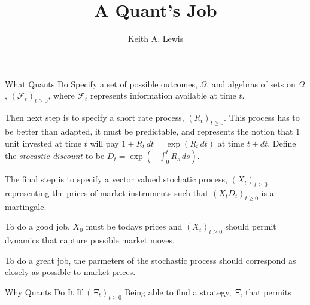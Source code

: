 \documentclass[fleqn]{amsart}
\title{A Quant's Job}
\author{Keith A. Lewis}
\def\F{\mathcal{F}}
\begin{document}
\maketitle

\begin{section}{What Quants Do}
Specify a set of possible outcomes, $\Omega$,
and algebras of sets on $\Omega$, $(\F_t)_{t\ge0}$, where $\F_t$ represents
information available at time $t$.

Then next step is to specify a short rate process, $(R_t)_{t\ge0}$.
This process has to be better than adapted, it must be predictable, and
represents the notion that 1 unit invested at time $t$ will pay $1 +
R_t\,dt = \exp(R_t\,dt)$ at time $t + dt$.  Define the {\em stocastic
discount} to be $D_t = \exp(-\int_0^t R_s\,ds)$.

The final step is to specify a vector valued stochatic process,
$(X_t)_{t\ge0}$ representing the prices of market instruments
such that $(X_tD_t)_{t\ge0}$ is a martingale.

To do a good job, $X_0$ must be todays prices and $(X_t)_{t\ge0}$ should
permit dynamics that capture possible market moves.

To do a great job, the parmeters of the stochastic process should
correspond as closely as possible to market prices.
\end{section}

\begin{section}{Why Quants Do It}
If $(\Xi_t)_{t\ge0}$ 
Being able to find a strategy, $\Xi$, that permits 
\end{section}
\end{document}
